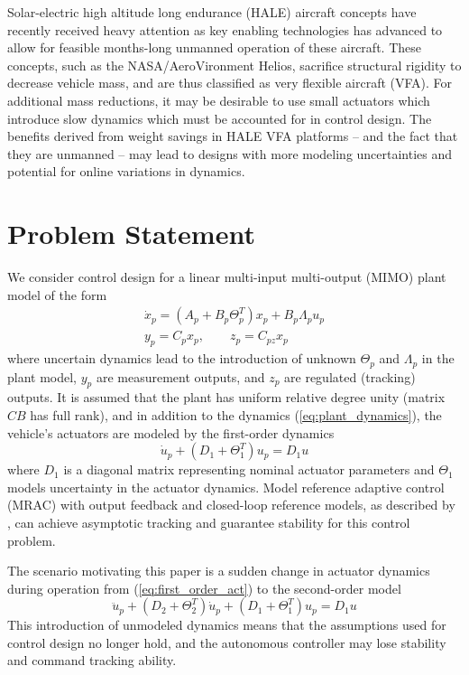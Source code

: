 \documentclass[english]{ifacconf}
\begin{document}
Solar-electric high altitude long endurance (HALE) aircraft concepts have recently received heavy attention as key enabling technologies has advanced to allow for feasible months-long unmanned operation of these aircraft. These concepts, such as the NASA/AeroVironment Helios, sacrifice structural rigidity to decrease vehicle mass, and are thus classified as very flexible aircraft (VFA). For additional mass reductions, it may be desirable to use small actuators which introduce slow dynamics which must be accounted for in control design. The benefits derived from weight savings in HALE VFA platforms -- and the fact that they are unmanned -- may lead to designs with more modeling uncertainties and potential for online variations in dynamics.

\section{Problem Statement}\label{sec:problem}
We consider control design for a linear multi-input multi-output (MIMO) plant model of the form
\begin{equation}
\begin{gathered}
\dot x_p = (A_p + B_p \Theta_p^T) x_p + B_p \Lambda_p u_p \\
y_p = C_p x_p, \qquad z_p = C_{pz} x_p \label{eq:plant_dynamics}
\end{gathered}
\end{equation}
where uncertain dynamics lead to the introduction of unknown $\Theta_p$ and $\Lambda_p$ in the plant model, $y_p$ are measurement outputs, and $z_p$ are regulated (tracking) outputs. It is assumed that the plant has uniform relative degree unity (matrix $CB$ has full rank), and in addition to the dynamics (\ref{eq:plant_dynamics}), the vehicle's actuators are modeled by the first-order dynamics
\begin{equation}
	\dot{u}_p + (D_1 + \Theta_1^T) u_p = D_1 u \label{eq:first_order_act}
\end{equation}
where $D_1$ is a diagonal matrix representing nominal actuator parameters and $\Theta_1$ models uncertainty in the actuator dynamics. Model reference adaptive control (MRAC) with output feedback and closed-loop reference models, as described by \cite{qu2016adaptive}, can achieve asymptotic tracking and guarantee stability for this control problem. 

The scenario motivating this paper is a sudden change in actuator dynamics during operation from (\ref{eq:first_order_act}) to the second-order model
\begin{equation}
	\ddot{u}_p + (D_2 + \Theta_2^T) \dot{u}_p + (D_1 + \Theta_1^T) u_p = D_1 u \label{eq:second_order_act}
\end{equation}
This introduction of unmodeled dynamics means that the assumptions used for control design no longer hold, and the autonomous controller may lose stability and command tracking ability. 
\end{document}
